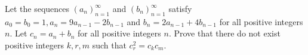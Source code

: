 Let the sequences $(a_n)_{n=1}^{\infty}$  and $(b_n)_{n=1}^{\infty}$  satisfy $a_0 = b_0 = 1, a_n = 9a_{n-1} -2b_{n-1}$ and $b_n = 2a_{n-1} + 4b_{n-1}$ for all positive integers $n$. Let $c_n = a_n + b_n$ for all positive integers $n$.
Prove that there do not exist positive integers $k, r, m$ such that $c^2_r = c_kc_m$.